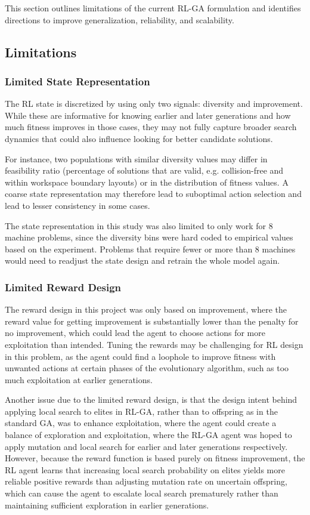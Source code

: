 \documentclass{article}
\begin{document}
This section outlines limitations of the current RL-GA formulation and identifies directions to improve generalization, reliability, and scalability.

\subsection{Limitations}

\subsubsection{Limited State Representation}
The RL state is discretized by using only two signals: diversity and improvement. While these are informative for knowing earlier and later generations and how much fitness improves in those cases, they may not fully capture broader search dynamics that could also influence looking for better candidate solutions. 

For instance, two populations with similar diversity values may differ in feasibility ratio (percentage of solutions that are valid, e.g. collision-free and within workspace boundary layouts) or in the distribution of fitness values. A coarse state representation may therefore lead to suboptimal action selection and lead to lesser consistency in some cases. 

The state representation in this study was also limited to only work for 8 machine problems, since the diversity bins were hard coded to empirical values based on the experiment. Problems that require fewer or more than 8 machines would need to readjust the state design and retrain the whole model again.

\subsubsection{Limited Reward Design}
The reward design in this project was only based on improvement, where the reward value for getting improvement is substantially lower than the penalty for no improvement, which could lead the agent to choose actions for more exploitation than intended. Tuning the rewards may be challenging for RL design in this problem, as the agent could find a loophole to improve fitness with unwanted actions at certain phases of the evolutionary algorithm, such as too much exploitation at earlier generations.

Another issue due to the limited reward design, is that the design intent behind applying local search to elites in RL-GA, rather than to offspring as in the standard GA, was to enhance exploitation, where the agent could create a balance of exploration and exploitation, where the RL-GA agent was hoped to apply mutation and local search for earlier and later generations respectively. However, because the reward function is based purely on fitness improvement, the RL agent learns that increasing local search probability on elites yields more reliable positive rewards than adjusting mutation rate on uncertain offspring, which can cause the agent to escalate local search prematurely rather than maintaining sufficient exploration in earlier generations.
\end{document}
